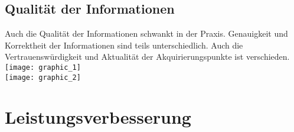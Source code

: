 \subsection{Qualität der Informationen}
Auch die Qualität der Informationen schwankt in der Praxis. Genauigkeit und Korrektheit der Informationen sind teils unterschiedlich. Auch die Vertrauenswürdigkeit und Aktualität der Akquirierungspunkte ist verschieden.\\
\texttt{[image: graphic\_1]}\\
\texttt{[image: graphic\_2]}
\pagebreak

\section{Leistungsverbesserung}
